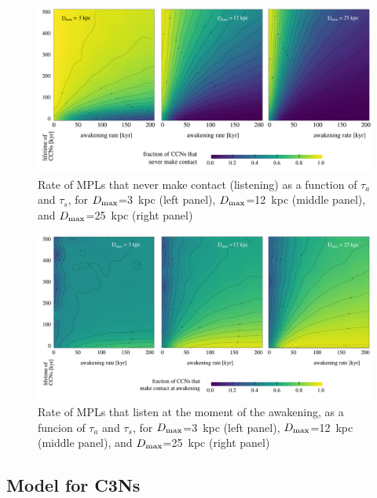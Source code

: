 \documentclass[crop]{CSLB}
\newcommand{\cetis}{C3Ns}
\begin{document}
  
\begin{figure} %
   \centering
   \includegraphics[width=\textwidth]{F_never_contact.pdf}
   \caption{
Rate of MPLs that never make contact (listening) as a
function of $\tau_a$ and $\tau_s$, for 
$D_{\rm max}$=3~kpc (left panel),
$D_{\rm max}$=12~kpc (middle panel), and
$D_{\rm max}$=25~kpc (right panel)
%
   }
   \label{F_never_contact}
\end{figure}
 
\begin{figure} %
   \centering
   \includegraphics[width=\textwidth]{F_C_at_A.pdf}
   \caption{
Rate of MPLs that listen at the moment of the
awakening, as a funcion of $\tau_a$ and $\tau_s$, for
$D_{\rm max}$=3~kpc (left panel),
$D_{\rm max}$=12~kpc (middle panel), and
$D_{\rm max}$=25~kpc (right panel)
%
   }
   \label{F_C_at_A}
\end{figure}
        

                     

\subsection{Model for \cetis{}}
\end{document}

